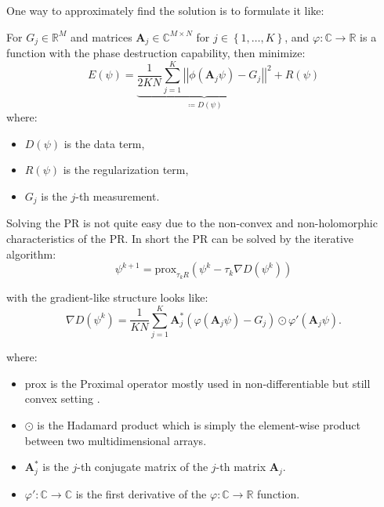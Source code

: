 \noindent One way to approximately find the solution is to formulate it like:
\begin{Pro}\label{pro:phase_retrieval_problem} For $G_j \in \mathbb{R}^M$ and matrices 
  $\boldsymbol{A}_j \in \mathbb{C}^{M \times N}$ for $j \in \left\{1,\ldots,K\right\}$, and 
  $\varphi \colon \mathbb{C} \to \mathbb{R}$ is a function with the phase destruction capability, then minimize:
  \begin{equation}\label{eq:phase_retrieval_problem}
    E(\psi) = \underbrace{\frac{1}{2KN} \sum_{j=1}^{K} {\left|\left|\phi(\boldsymbol{A}_j\psi)-G_j\right|\right|}^2}_{\coloneqq D(\psi)}+ R(\psi)
    \end{equation}
    where:
  \begin{itemize}
    \item $D(\psi)$ is the data term,
    \item $R(\psi)$ is the regularization term,
    \item $G_j$ is the $j$-th measurement.
    \end{itemize}
\end{Pro}

\noindent Solving the \acl*{PR} is not quite easy due to the non-convex and non-holomorphic characteristics of the \acl*{PR}. 
In short the \acl*{PR} can be solved by the iterative algorithm:
  \begin{equation}\label{eq:pr_solution}
	\psi^{k+1} = \text{prox}_{\tau_{k}R}(\psi^k-\tau_k\nabla{D(\psi^k)})
  \end{equation}

  with the gradient-like structure looks like: 
  \begin{equation}\label{eq:gradient_pr_solution}
	\nabla{D(\psi^k)} = \frac{1}{KN} \sum_{j=1}^{K} \boldsymbol{A}_j^*\left(\varphi\left(\boldsymbol{A}_j\psi\right)-G_j\right)\odot \varphi'(\boldsymbol{A}_j\psi).
  \end{equation}

  where:
  \begin{itemize}
	\item $\mathrm{prox}$ is the Proximal operator mostly used in non-differentiable but still convex setting \cite{Bredies2018}.
	\item $\odot$ is the Hadamard product\cite{Hackbusch2019} which is simply the element-wise product between two multidimensional arrays.
	\item $\boldsymbol{A}^*_j$ is the $j$-th conjugate matrix of the $j$-th matrix $\boldsymbol{A}_j$.
	\item $\varphi' \colon \mathbb{C} \to \mathbb{C}$ is the first derivative of the $\varphi \colon \mathbb{C} \to \mathbb{R}$ function.
  \end{itemize}

